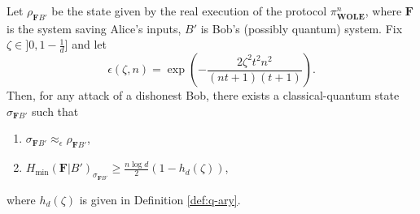 \begin{lemma}
\label{lemma:wole_bob_dishonest}

Let $\rho_{\mathbf{F} B'}$ be the state given by the real execution of the protocol $\mathcal{\pi}^n_{\textbf{WOLE}}$, where $\mathbf{F}$ is the system saving Alice's inputs, $B'$ is Bob's (possibly quantum) system. Fix $\zeta \in ]0, 1-\frac{1}{d}]$ and let 
\begin{equation}
    \epsilon(\zeta, n) =\exp( -\frac{2 \zeta^2t^2n^2}{(nt+1)(t+1)}).
    \label{eq:epsilon}
\end{equation}Then, for any attack of a dishonest Bob, there exists a classical-quantum state $\sigma_{\mathbf{F} B'}$ such that

\begin{enumerate}
    \item $\sigma_{\mathbf{F} B'} \approx_{\epsilon} \rho_{\mathbf{F} B'}$,
    \item $ H_{\min}( \mathbf{F} | B' )_{\sigma_{\mathbf{F} B'}} \geq \frac{n\log d}{2}(1 - h_d(\zeta)) $,
\end{enumerate}
where $h_d(\zeta)$ is given in Definition \ref{def:q-ary}.

\end{lemma}

